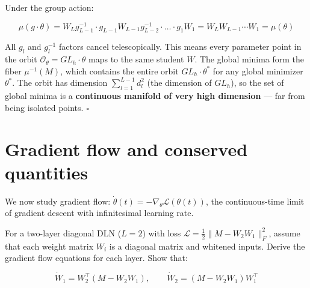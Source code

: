 \documentclass[11pt]{article}
\begin{document}
\begin{solution}[ex:td-1d]
Under the group action:

\[\mu(g \cdot \theta) = W_L g_{L-1}^{-1} \cdot g_{L-1} W_{L-1} g_{L-2}^{-1} \cdot \ldots \cdot g_1 W_1 = W_L W_{L-1} \cdots W_1 = \mu(\theta)\]

All \(g_l\) and \(g_l^{-1}\) factors cancel telescopically. This means
every parameter point in the orbit
\(\mathcal{O}_\theta = GL_h \cdot \theta\) maps to the same student
\(W\). The global minima form the fiber \(\mu^{-1}(M)\), which contains
the entire orbit \(GL_h \cdot \theta^*\) for any global minimizer
\(\theta^*\). The orbit has dimension \(\sum_{l=1}^{L-1} d_l^2\) (the
dimension of \(GL_h\)), so the set of global minima is a
\textbf{continuous manifold of very high dimension} --- far from being
isolated points. \(\square\)
\end{solution}

\section{Gradient flow and conserved quantities}
\label{sec:td-gradflow}

We now study gradient flow:
\(\dot{\theta}(t) = -\nabla_\theta \mathcal{L}(\theta(t))\), the
continuous-time limit of gradient descent with infinitesimal learning
rate.

\begin{exercise}
\label{ex:td-2a}
For a two-layer diagonal DLN (\(L=2\)) with loss
\(\mathcal{L} = \frac{1}{2}\|M - W_2 W_1\|_F^2\), assume that each weight matrix $W_i$ is a diagonal matrix and whitened inputs.
Derive the gradient flow equations for each layer. Show that:

\[\dot{W}_1 = W_2^\top(M - W_2 W_1), \qquad \dot{W}_2 = (M - W_2 W_1) W_1^\top\]
\end{exercise}
\end{document}
